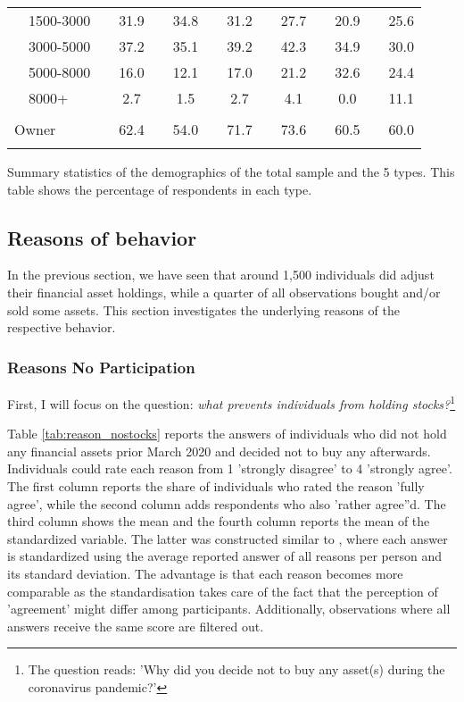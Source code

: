 \documentclass[ProjectABM]{subfiles}
\begin{document}
\begin{table}[]
{\begin{threeparttable}
\begin{tabular}{ll|cccccccccccc}
				& 1500-3000 &  & 31.9 &  & 34.8 &  & 31.2 &  & 27.7 &  & 20.9 &  & 25.6 \\
				& 3000-5000 &  & 37.2 &  & 35.1 &  & 39.2 &  & 42.3 &  & 34.9 &  & 30.0 \\
				& 5000-8000 &  & 16.0 &  & 12.1 &  & 17.0 &  & 21.2 &  & 32.6 &  & 24.4 \\
				& 8000+ &  & 2.7 &  & 1.5 &  & 2.7 &  & 4.1 &  & 0.0 &  & 11.1 \\
				&  &  &  &  &  &  &  &  &  &  &  &  &  \\
				\multicolumn{2}{l|}{Owner} &  & 62.4 &  & 54.0 &  & 71.7 &  & 73.6 &  & 60.5 &  & 60.0 \\ 
				& &  &  &  &  &  &  &  &  &  &  &  &  \\ \hline \hline
			\end{tabular}
			\begin{tablenotes}\footnotesize
				\item[] Summary statistics of the demographics of the total sample and the 5 types. This table shows the percentage of respondents in each type.
			\end{tablenotes}
		\end{threeparttable}
	}
\end{table}

\subsection{Reasons of behavior}
In the previous section, we have seen that around 1,500 individuals did adjust their financial asset holdings, while a quarter of all observations bought and/or sold some assets. This section investigates the underlying reasons of the respective behavior.

\subsubsection{Reasons No Participation}
First, I will focus on the question: \textit{what prevents individuals from holding stocks?}\footnote{The question reads: 'Why did you decide not to buy any asset(s) during the coronavirus pandemic?'} 

Table \ref{tab:reason_nostocks} reports the answers of individuals who did not hold any financial assets prior March 2020 and decided not to buy any afterwards. Individuals could rate each reason from 1 'strongly disagree' to 4 'strongly agree'. The first column reports the share of individuals who rated the reason 'fully agree', while the second column adds respondents who also 'rather agree''d. The third column shows the mean and the fourth column reports the mean of the standardized variable. The latter was constructed similar to \cite{choi_2020}, where each answer is standardized using the average reported answer of all reasons per person and its standard deviation. The advantage is that each reason becomes more comparable as the standardisation takes care of the fact that the perception of 'agreement' might differ among participants. Additionally, observations where all answers receive the same score are filtered out.
\end{document}
